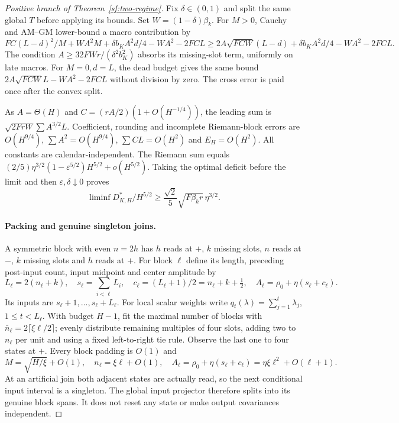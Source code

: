 \begin{proof}[Positive branch of Theorem~\ref{sf:two-regime}]
Fix $\delta\in(0,1)$ and split the same global $T$ before applying its bounds.
Set $W=(1-\delta)\beta_k$.
For $M>0$, Cauchy and AM--GM lower-bound a macro contribution by
\[
FC(L-d)^2/M+WA^2M+\delta b_KA^2d/4-WA^2-2FCL
\ge2A\sqrt{FCW}(L-d)+\delta b_KA^2d/4-WA^2-2FCL.
\]
The condition $A\ge32FWr/(\delta^2b_K^2)$ absorbs its missing-slot term,
uniformly on late macros. For $M=0,d=L$, the dead budget gives the same
bound $2A\sqrt{FCW}L-WA^2-2FCL$ without division by zero.
The cross error is paid once after the convex split.

As $A=\Theta(H)$ and $C=(rA/2)(1+O(H^{-1/4}))$, the leading sum is
$\sqrt{2FrW}\sum A^{3/2}L$.
Coefficient, rounding and incomplete Riemann-block errors are $O(H^{9/4})$,
$\sum A^2=O(H^{9/4})$, $\sum CL=O(H^2)$ and $E_H=O(H^2)$.
All constants are calendar-independent.
The Riemann sum equals
$(2/5)\eta^{3/2}(1-\varepsilon^{5/2})H^{5/2}+o(H^{5/2})$.
Taking the optimal deficit before the limit and then
$\varepsilon,\delta\downarrow0$ proves
\begin{equation}\label{sf:lower}
\liminf D_{K,H}^*/H^{5/2}\ge
\frac{\sqrt2}{5}\sqrt{F\beta_k r}\,\eta^{3/2}.
\end{equation}

\paragraph{Packing and genuine singleton joins.}
A symmetric block with even $n=2h$ has $h$ reads at $+$, $k$ missing slots,
$n$ reads at $-$, $k$ missing slots and $h$ reads at $+$.
For block $\ell$ define its length, preceding post-input count,
input midpoint and center amplitude by
\begin{equation}\label{sf:block}
L_\ell=2(n_\ell+k),\quad s_\ell=\sum_{i<\ell}L_i,\quad
c_\ell=(L_\ell+1)/2=n_\ell+k+\tfrac12,\quad
A_\ell=\rho_0+\eta(s_\ell+c_\ell).
\end{equation}
Its inputs are $s_\ell+1,\ldots,s_\ell+L_\ell$. For local scalar weights
write $q_t(\lambda)=\sum_{j=1}^t\lambda_j$, $1\le t<L_\ell$.
With budget $H-1$, fit the maximal number of blocks with
$\bar n_\ell=2\lceil\xi\ell/2\rceil$; evenly distribute remaining multiples of
four slots, adding two to $n_\ell$ per unit and using a fixed left-to-right
tie rule. Observe the last one to four states at $+$.
Every block padding is $O(1)$ and
\[
M=\sqrt{H/\xi}+O(1),\quad n_\ell=\xi\ell+O(1),\quad
A_\ell=\rho_0+\eta(s_\ell+c_\ell)=\eta\xi\ell^2+O(\ell+1).
\]
At an artificial join both adjacent states are actually read, so the next
conditional input interval is a singleton.
The global input projector therefore splits into its genuine block spans.
It does not reset any state or make output covariances independent.


\end{proof}
